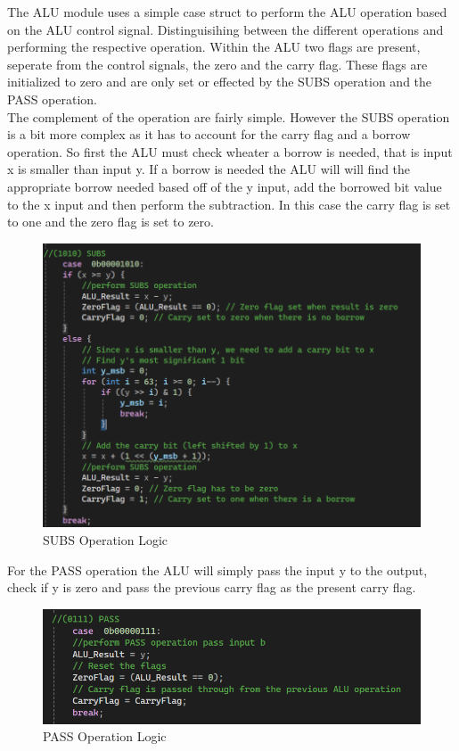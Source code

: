 \documentclass{article}
\begin{document}
The ALU module uses a simple case struct to perform the ALU operation based on the ALU control signal. Distinguisihing between the different operations and performing the respective operation. Within the ALU two flags are present, seperate from the control signals, the zero and the carry flag. These flags are initialized to zero and are only set or effected by the SUBS operation and the PASS operation.\\

The complement of the operation are fairly simple. However the SUBS operation is a bit more complex as it has to account for the carry flag and a borrow operation. So first the ALU must check wheater a borrow is needed, that is input x is smaller than input y. If a borrow is needed the ALU will will find the appropriate borrow needed based off of the y input, add the borrowed bit value to the x input and then perform the subtraction. In this case the carry flag is set to one and the zero flag is set to zero.\\

\begin{figure}[htbp]
    \centering
    \includegraphics[width=1\textwidth]{screen_dumps/SUBS_logic.png}
    \caption{SUBS Operation Logic}
    \label{fig:5}
\end{figure}


For the PASS operation the ALU will simply pass the input y to the output, check if y is zero and pass the previous carry flag as the present carry flag.\\


\begin{figure}[htbp]
    \centering
    \includegraphics[width=1\textwidth]{screen_dumps/PASS_logic.png}
    \caption{PASS Operation Logic}
    \label{fig:6}
\end{figure}
\end{document}
